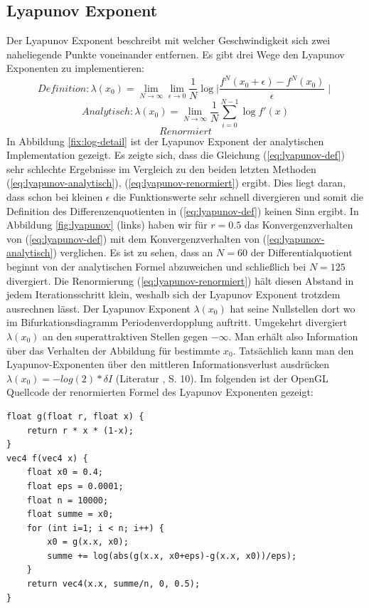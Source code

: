 \documentclass[11,5pt, twoside]{article}
\begin{document}
\subsection{Lyapunov Exponent}
Der Lyapunov Exponent beschreibt mit welcher Geschwindigkeit sich zwei naheliegende Punkte voneinander entfernen. 
Es gibt drei Wege den Lyapunov Exponenten zu implementieren:
\begin{equation}
Definition: \lambda(x_0) = \lim_{N \rightarrow \infty}\lim_{\epsilon \rightarrow 0} \frac{1}{N}\log{\mid \frac{f^N(x_0+\epsilon)- f^N(x_0)}{\epsilon} \mid} 
\label{eq:lyapunov-def}
\end{equation}
\begin{equation}
Analytisch: \lambda(x_0) = \lim_{N \rightarrow \infty} \frac{1}{N} \sum_{i=0}^{N-1}  \log{f'(x)} 
\label{eq:lyapunov-analytisch}
\end{equation}
\begin{equation}
Renormiert
\label{eq:lyapunov-renormiert}
\end{equation}
In Abbildung \ref{fix:log-detail} ist der Lyapunov Exponent der analytischen Implementation gezeigt.
Es zeigte sich, dass die Gleichung (\ref{eq:lyapunov-def}) sehr schlechte Ergebnisse im Vergleich zu den beiden letzten Methoden (\ref{eq:lyapunov-analytisch}), (\ref{eq:lyapunov-renormiert}) ergibt.
Dies liegt daran, dass schon bei kleinen $\epsilon$ die Funktionswerte sehr schnell divergieren und somit die Definition des Differenzenquotienten in (\ref{eq:lyapunov-def}) keinen Sinn ergibt.
In Abbildung \ref{fig:lyapunov} (links) haben wir für $r=0.5$ das Konvergenzverhalten von (\ref{eq:lyapunov-def}) mit dem Konvergenzverhalten von (\ref{eq:lyapunov-analytisch}) verglichen. Es ist zu sehen, dass an $N=60$ der Differentialquotient beginnt von der analytischen Formel abzuweichen und schließlich bei $N=125$ divergiert.
Die Renormierung (\ref{eq:lyapunov-renormiert}) hält diesen Abstand in jedem Iterationsschritt klein, weshalb sich der Lyapunov Exponent trotzdem ausrechnen lässt.
Der Lyapunov Exponent $\lambda(x_0)$ hat seine Nullstellen dort wo im Bifurkationsdiagramm Periodenverdopplung auftritt. Umgekehrt divergiert $\lambda(x_0)$ an den superattraktiven Stellen gegen $-\infty$.
Man erhält also Information über das Verhalten der Abbildung für bestimmte $x_0$.
Tatsächlich kann man den Lyapunov-Exponenten über den mittleren Informationsverlust ausdrücken $\lambda(x_0)=-log(2)*\delta I$ (Literatur \parencite{versuchmappe}, S. 10).
Im folgenden ist der OpenGL Quellcode der renormierten Formel des Lyapunov Exponenten gezeigt:
\begin{lstlisting}
float g(float r, float x) {
    return r * x * (1-x);
}
vec4 f(vec4 x) {
    float x0 = 0.4;
    float eps = 0.0001;
    float n = 10000;
    float summe = x0;
    for (int i=1; i < n; i++) {
        x0 = g(x.x, x0);
        summe += log(abs(g(x.x, x0+eps)-g(x.x, x0))/eps);
    }
    return vec4(x.x, summe/n, 0, 0.5);
}
\end{lstlisting}
\end{document}

